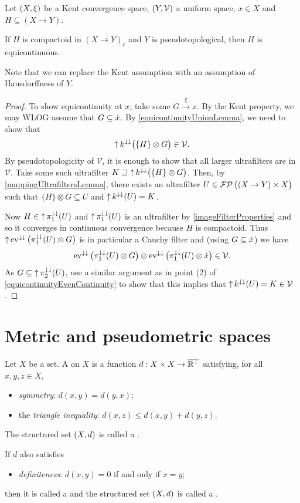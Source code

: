 \begin{proposition}
Let $\sSet{X,\xi}$ be a Kent convergence space, $\sSet{Y, \mathcal{V}}$ a uniform space, $x\in X$ and $H \subseteq (X\to Y)$.

If $H$ is compactoid in $(X\to Y)_c$ and $Y$ is pseudotopological, then $H$ is equicontinuous.
\end{proposition}
Note that we can replace the Kent assumption with an assumption of Hausdorffness of $Y$.
\begin{proof}
To show equicontinuity at $x$, take some $G\overset{\xi}{\longrightarrow} x$. By the Kent property, we may WLOG assume that $G\subseteq \dot{x}$. By \ref{equicontinuityUnionLemma}, we need to show that
\[ \operatorname{\uparrow} k^{\downarrow\downarrow}\big(\{H\}\otimes G\big) \in \mathcal{V}. \]
By pseudotopologicity of $\mathcal{V}$, it is enough to show that all larger ultrafilters are in $\mathcal{V}$. Take some such ultrafilter $K \supseteq \operatorname{\uparrow} k^{\downarrow\downarrow}\big(\{H\}\otimes G\big)$. Then, by \ref{mappingUltrafiltersLemma}, there exists an ultrafilter $U\in \operatorname{\mathcal{FP}}\big((X\to Y)\times X\big)$ such that $\{H\}\otimes G \subseteq U$ and $\operatorname{\uparrow} k^{\downarrow\downarrow}(U) = K$.

Now $H\in \operatorname{\uparrow}\pi_1^{\downarrow\downarrow}(U)$ and $\operatorname{\uparrow}\pi_1^{\downarrow\downarrow}(U)$ is an ultrafilter by \ref{imageFilterProperties} and so it converges in continuous convergence because $H$ is compactoid. Thus $\operatorname{\uparrow}\operatorname{ev}^{\downarrow\downarrow}\big(\pi_1^{\downarrow\downarrow}(U)\otimes G\big)$ is in particular a Cauchy filter and (using $G\subseteq \dot{x}$) we have
\[ \operatorname{ev}^{\downarrow\downarrow}\big(\pi_1^{\downarrow\downarrow}(U)\otimes G\big) \otimes \operatorname{ev}^{\downarrow\downarrow}\big(\pi_1^{\downarrow\downarrow}(U)\otimes \dot{x}\big) \in \mathcal{V}. \]
As $G \subseteq \operatorname{\uparrow}\pi_2^{\downarrow\downarrow}(U)$, use a similar argument as in point (2) of \ref{equicontinuityEvenContinuity} to show that this implies that $\operatorname{\uparrow} k^{\downarrow\downarrow}(U) = K \in \mathcal{V}$.
\end{proof}

\section{Metric and pseudometric spaces}
\begin{definition}
Let $X$ be a set. A  on $X$ is a function $d: X\times X\to \overline{\mathbb{R}^+}$ satisfying, for all $x,y,z\in X$,
\begin{itemize}
\item \emph{symmetry}: $d(x,y) = d(y,x)$;
\item the \emph{triangle inequality}: $d(x,z) \leq d(x,y) + d(y,z)$.
\end{itemize}
The structured set $\sSet{X,d}$ is called a .

If $d$ also satisfies
\begin{itemize}
\item \emph{definiteness}: $d(x,y) = 0$ \textup{if and only if} $x=y$;
\end{itemize}
then it is called a  and the structured set $\sSet{X,d}$ is called a .
\end{definition}

